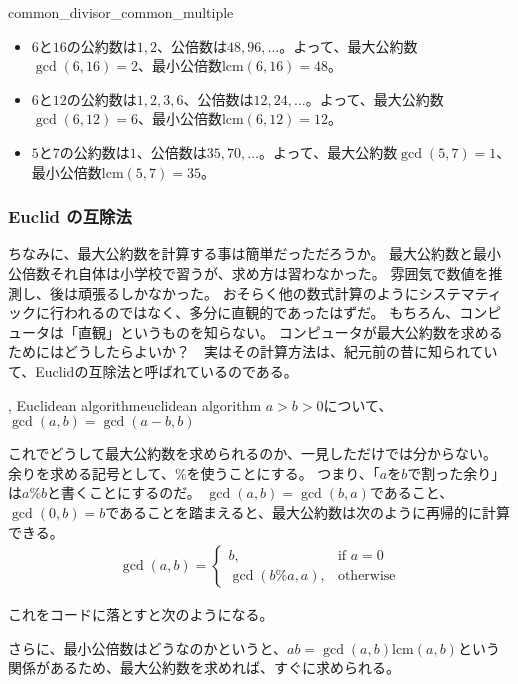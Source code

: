 \begin{Exam}{}{common_divisor_common_multiple}\;
\begin{itemize}
 \item $6$と$16$の公約数は$1,2$、公倍数は$48, 96, \ldots$。よって、最大公約数$\gcd(6,16)=2$、最小公倍数$\mbox{lcm}(6,16)=48$。
 \item $6$と$12$の公約数は$1,2,3,6$、公倍数は$12, 24, \ldots$。よって、最大公約数$\gcd(6,12)=6$、最小公倍数$\mbox{lcm}(6,12)=12$。
 \item $5$と$7$の公約数は$1$、公倍数は$35, 70, \ldots$。よって、最大公約数$\gcd(5,7)=1$、最小公倍数$\mbox{lcm}(5,7)=35$。
\end{itemize}
\end{Exam}

\subsubsection{Euclid の互除法}
ちなみに、最大公約数を計算する事は簡単だっただろうか。
最大公約数と最小公倍数それ自体は小学校で習うが、求め方は習わなかった。
雰囲気で数値を推測し、後は頑張るしかなかった。
おそらく他の数式計算のようにシステマティックに行われるのではなく、多分に直観的であったはずだ。
もちろん、コンピュータは「直観」というものを知らない。
コンピュータが最大公約数を求めるためにはどうしたらよいか？　実はその計算方法は、紀元前の昔に知られていて、Euclidの互除法と呼ばれているのである。

\begin{Theo}{, Euclidean algorithm}{euclidean algorithm}
$a>b>0$について、$\gcd(a,b) = \gcd(a - b, b)$
\end{Theo}

これでどうして最大公約数を求められるのか、一見しただけでは分からない。
余りを求める記号として、$\%$を使うことにする。
つまり、「$a$を$b$で割った余り」は$a \% b$と書くことにするのだ。
$\gcd(a,b)=\gcd(b,a)$であること、$\gcd(0,b)=b$であることを踏まえると、最大公約数は次のように再帰的に計算できる。
\begin{align*}
\gcd(a,b) =
\begin{cases}
b, &\mbox{if } a = 0\\
\gcd(b \% a, a), &\mbox{otherwise}
\end{cases}
\end{align*}

これをコードに落とすと次のようになる。


さらに、最小公倍数はどうなのかというと、$ab = \gcd(a,b)\mbox{lcm}(a,b)$という関係があるため、最大公約数を求めれば、すぐに求められる。

